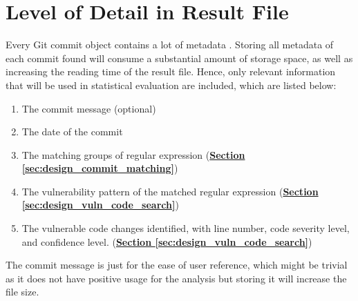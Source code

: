 \documentclass[12pt, a4paper]{report}
\begin{document}
\section{Level of Detail in Result File} \label{sec:lod_result}
Every Git commit object contains a lot of metadata \cite{chacon_2014}. Storing all metadata of each
commit found will consume a substantial amount of storage space, as well as increasing the reading
time of the result file. Hence, only relevant information that will be used in statistical
evaluation are included, which are listed below:
\begin{enumerate}
  \item The commit message (optional)
  \item The date of the commit
  \item The matching groups of regular expression
  (\hyperref[sec:design_commit_matching]{\textbf{Section \ref*{sec:design_commit_matching}}})
  \item The vulnerability pattern of the matched regular expression
  (\hyperref[sec:design_vuln_code_search]{\textbf{Section \ref*{sec:design_vuln_code_search}}})
  \item The vulnerable code changes identified, with line number, code severity level, and
  confidence level. (\hyperref[sec:design_vuln_code_search]{\textbf{Section
  \ref*{sec:design_vuln_code_search}}})
\end{enumerate}

The commit message is just for the ease of user reference, which might be trivial as it does not
have positive usage for the analysis but storing it will increase the file size.
\end{document}
